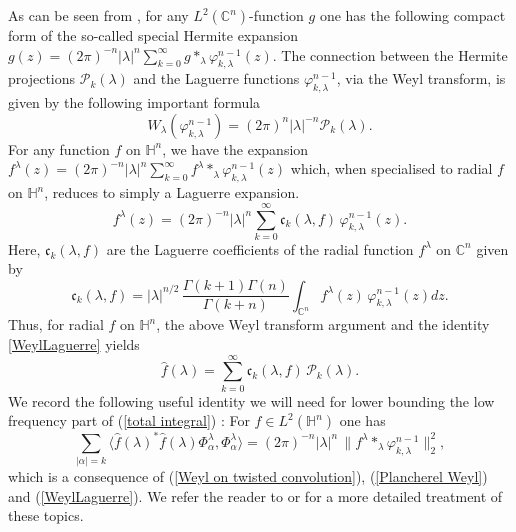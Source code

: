 \documentclass[11pt, reqno]{amsart}
\theoremstyle{plain}
\theoremstyle{remark}
\theoremstyle{example}
\theoremstyle{definition}
\numberwithin{equation}{section}
\def\H{\mathbb{H}}
\def\Ha{\mathbb{H}^n}
\def\C{\mathbb{C}}
\newcommand{\Ca}{\mathbb{C}^n}
\begin{document}
As can be seen from \cite{STU}, for any $L^{2}(\Ca)$-function $g$ one has the following compact form of the  so-called special Hermite expansion $ g(z)=(2\pi)^{-n} |\lambda|^n \sum_{k=0}^\infty  g*_\lambda \varphi_{k,\lambda}^{n-1}(z).$ The connection between the Hermite projections $\mathcal{P}_{k} (\lambda)$ and the Laguerre functions $\varphi_{k, \lambda}^{n-1}$, via the Weyl transform, is given by the following important formula
\begin{equation}
\label{WeylLaguerre}
W_\lambda(\varphi_{k,\lambda}^{n-1}) = (2\pi)^n |\lambda|^{-n} \mathcal{P}_{k} (\lambda).
\end{equation}
For any function $f$ on $\H^n$, we have the expansion $f^{\lambda}(z)=(2\pi)^{-n} |\lambda|^n \sum_{k=0}^\infty  f^{\lambda}*_\lambda \varphi_{k,\lambda}^{n-1}(z)$ 
which, when specialised to radial $f$ on $\Ha$, reduces to simply a Laguerre expansion. 
$$
f^{\lambda}(z)=(2\pi)^{-n} |\lambda|^n \sum_{k=0}^\infty  \mathfrak{c}_k(\lambda, f) \, \varphi_{k,\lambda}^{n-1} (z).
$$
Here, $ \mathfrak{c}_k(\lambda, f) $ are the Laguerre coefficients of the radial function $ f^\lambda $ on $ \C^n$ given by
$$
\mathfrak{c}_k(\lambda, f)=  |\lambda|^{n/2} \,  \frac{\Gamma(k+1) \Gamma(n)}{\Gamma(k+n)}   \int_{\C^n} f^\lambda(z) \, \varphi_{k,\lambda}^{n-1}(z) dz.
$$
Thus, for radial $f$ on $\Ha$, the above Weyl transform argument and the identity \eqref{WeylLaguerre} yields
$$
\widehat{f}(\lambda) = \sum_{k=0}^\infty  \mathfrak{c}_k(\lambda, f) \,  \mathcal{P}_{k} (\lambda).
$$
We record the following useful identity we will need for lower bounding the low frequency part of (\ref{total integral}) : For $f \in L^{2}(\Ha)$ one has
\begin{equation}\label{twisted convol identity}
  \sum_{|\alpha|=k} \langle \widehat{f}(\lambda)^{*} \widehat{f}(\lambda) \Phi_{\alpha}^{\lambda} , \Phi_{\alpha}^{\lambda}  \rangle = (2 \pi)^{-n} |\lambda|^n \,   \| f^{\lambda} \ast_{\lambda} \varphi_{k, \lambda}^{n-1} \|_{2}^2,
\end{equation}
which is a consequence of (\ref{Weyl on twisted convolution}), (\ref{Plancherel Weyl}) and (\ref{WeylLaguerre}).  We refer the reader to \cite{Thangavelu-Heisenberg} or \cite{STU} for a more detailed treatment of these topics.
\end{document}
